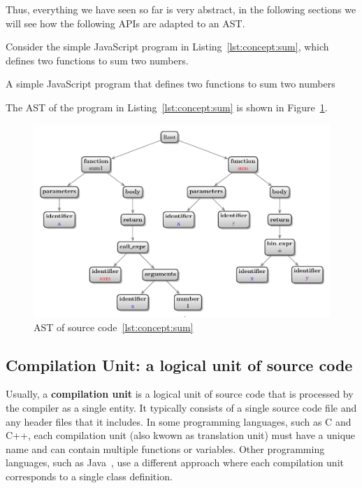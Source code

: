 Thus, everything we have seen so far is very abstract, in the following sections we will see how the following APIs are adapted to an AST.

Consider the simple JavaScript program in Listing~\ref{lst:concept:sum}, which defines two functions to sum two numbers.
\begin{Listing}[tbh]
    \centering
    \caption{A simple JavaScript program that defines two functions to sum two numbers}
    \label{lst:concept:sum}
\end{Listing}

The AST of the program in Listing~\ref{lst:concept:sum} is shown in Figure~\ref{lst:concept:ast_sum}.
\begin{figure}[t]
    \centering
    \includegraphics[width=0.9\linewidth]{figs/concept/simple_ast.pdf}
    \caption{AST of source code~\ref{lst:concept:sum}}
    \label{lst:concept:ast_sum}
\end{figure}

\subsection{Compilation Unit: a logical unit of source code}\label{subsec:concept:CompilationUnitALogicalUnitOfSourceCodeo}

Usually, a \textbf{compilation unit} is a logical unit of source code that is processed by the compiler as a single entity. It typically consists of a single source code file and any header files that it includes. In some programming languages, such as C and C++, each compilation unit (also kwown as translation unit) must have a unique name and can contain multiple functions or variables. Other programming languages, such as Java~\cite{javacompilationunits},  use a different approach where each compilation unit corresponds to a single class definition.

